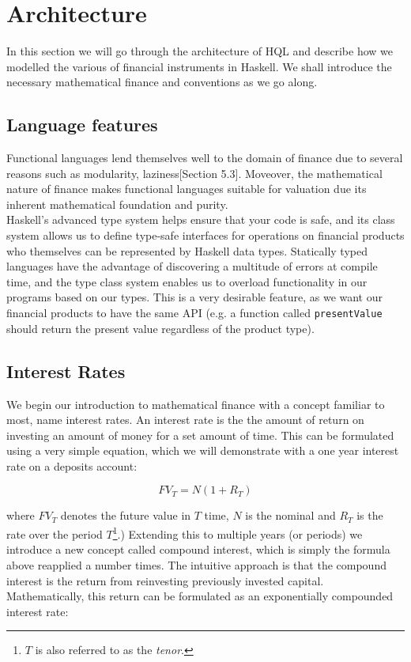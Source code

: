 \chapter{Architecture}

In this section we will go through the architecture of HQL and describe how we
modelled the various of financial instruments in Haskell. We shall introduce
the necessary mathematical finance and conventions as we go along.

\section{Language features}

Functional languages lend themselves well to the domain of finance due
to several reasons such as modularity\cite{hughes:matters-cj}, 
laziness\cite{composingcontracts}[Section 5.3]. Moveover, the mathematical
 nature of finance makes functional languages suitable for valuation due its
inherent mathematical foundation and purity.\\

Haskell's advanced type system helps ensure that your code is safe, and its 
class system allows us to define type-safe interfaces for operations on 
financial products who themselves can be represented by Haskell data types. 
Statically typed languages have the advantage of discovering a multitude of
errors at compile time, and the type class system enables us to overload 
functionality in our programs based on our types. This is a very desirable
feature, as we want our financial products to have the same API (e.g. a function 
called \texttt{presentValue} should return the present value regardless of the
product type).

\section{Interest Rates}

We begin our introduction to mathematical finance with a concept familiar to
most, name interest rates. An interest rate is the the amount of return on
investing an amount of money for a set amount of time. This can be formulated
using a very simple equation, which we will demonstrate with a one year interest
rate on a deposits account:

\begin{equation}\label{eq:lincomp}
FV_T = N (1 + R_T)
\end{equation}

where $FV_T$ denotes the future value in $T$ time, $N$ is the nominal and $R_T$
is the rate over the period $T$\footnote{$T$ is also referred to as the
\emph{tenor}.}.) Extending this to multiple years (or periods) we introduce a new 
concept called compound interest, which is  simply the formula above reapplied
a number times. The intuitive approach is
that the compound interest is the return from reinvesting previously invested
capital. Mathematically, this return can be formulated as an exponentially 
compounded interest rate:

